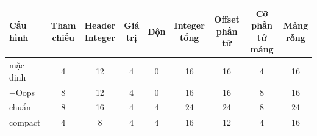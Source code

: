 \begin{tabular}{lcccccccc}
\toprule
Cấu hình & \makecell{Tham \\ chiếu} & \makecell{Header \\ Integer} & \makecell{Giá \\ trị} & Độn & \makecell{Integer \\ tổng} & \makecell{Offset \\ phần tử} & \makecell{Cỡ phần \\ tử mảng} & \makecell{Mảng \\ rỗng} \\
\midrule
mặc định & 4 & 12 & 4 & 0 & 16 & 16 & 4 & 16 \\
$-$Oops & 8 & 12 & 4 & 0 & 16 & 16 & 8 & 16 \\
chuẩn & 8 & 16 & 4 & 4 & 24 & 24 & 8 & 24 \\
compact & 4 & 8 & 4 & 4 & 16 & 12 & 4 & 16 \\
\bottomrule
\end{tabular}
